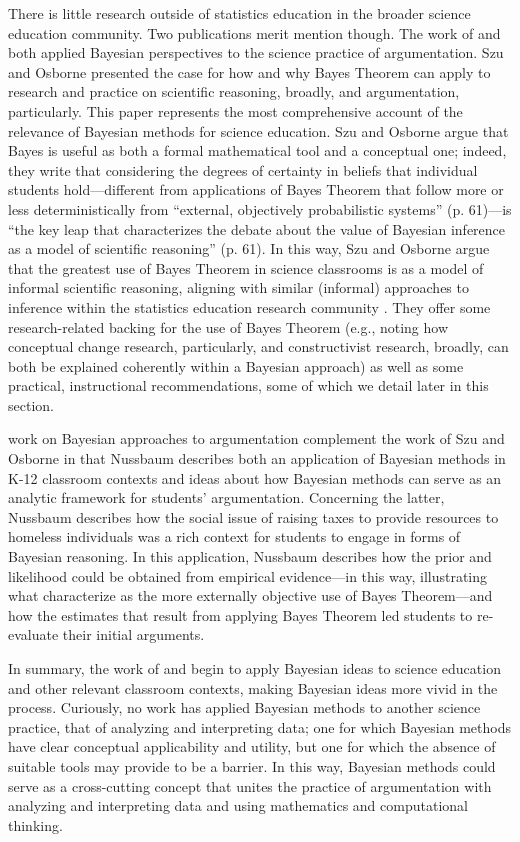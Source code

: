 \documentclass[man]{apa7}
\begin{document}
There is little research outside of statistics education in the broader science education community. Two publications merit mention though. The work of \textcite{so12} and \textcite{n11} both applied Bayesian perspectives to the science practice of argumentation. Szu and Osborne presented the case for how and why Bayes Theorem can apply to research and practice on scientific reasoning, broadly, and argumentation, particularly. This paper represents the most comprehensive account of the relevance of Bayesian methods for science education. Szu and Osborne argue that Bayes is useful as both a formal mathematical tool and a conceptual one; indeed, they write that considering the degrees of certainty in beliefs that individual students hold—different from applications of Bayes Theorem that follow more or less deterministically from ``external, objectively probabilistic systems'' (p. 61)—is ``the key leap that characterizes the debate about the value of Bayesian inference as a model of scientific reasoning'' (p. 61). In this way, Szu and Osborne argue that the greatest use of Bayes Theorem in science classrooms is as a model of informal scientific reasoning, aligning with similar (informal) approaches to inference within the statistics education research community \parencite{batanero2016research, mr18}. They offer some research-related backing for the use of Bayes Theorem (e.g., noting how conceptual change research, particularly, and constructivist research, broadly, can both be explained coherently within a Bayesian approach) as well as some practical, instructional recommendations, some of which we detail later in this section.

\textcite{n11} work on Bayesian approaches to argumentation complement the work of Szu and Osborne in that Nussbaum describes both an application of Bayesian methods in K-12 classroom contexts and ideas about how Bayesian methods can serve as an analytic framework for students’ argumentation. Concerning the latter, Nussbaum describes how the social issue of raising taxes to provide resources to homeless individuals was a rich context for students to engage in forms of Bayesian reasoning. In this application, Nussbaum describes how the prior and likelihood could be obtained from empirical evidence—in this way, illustrating what \textcite{so12} characterize as the more externally objective use of Bayes Theorem—and how the estimates that result from applying Bayes Theorem led students to re-evaluate their initial arguments. 

In summary, the work of \textcite{so12} and \textcite{n11} begin to apply Bayesian ideas to science education and other relevant classroom contexts, making Bayesian ideas more vivid in the process. Curiously, no work has applied Bayesian methods to another science practice, that of analyzing and interpreting data; one for which Bayesian methods have clear conceptual applicability and utility, but one for which the absence of suitable tools may provide to be a barrier. In this way, Bayesian methods could serve as a cross-cutting concept \parencite{nrc12} that unites the practice of argumentation with analyzing and interpreting data and using mathematics and computational thinking.
\end{document}
